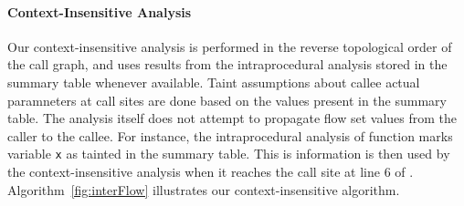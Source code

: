 \paragraph{Context-Insensitive Analysis}
Our context-insensitive analysis is performed
in the reverse topological order of the call graph,
and uses results from the intraprocedural analysis
stored in the summary table whenever available.
Taint assumptions about callee actual paramneters
at call sites are done based on the values present
in the summary table. The analysis itself does not
attempt to propagate flow set values from the caller
to the callee.
For instance, the intraprocedural analysis of function
\main{} marks variable \texttt{x} as tainted in the
summary table. This is information is then used by
the context-insensitive analysis when it reaches the
call site at line $6$ of \main{}.
Algorithm~\ref{fig:interFlow} illustrates our context-insensitive
algorithm.


